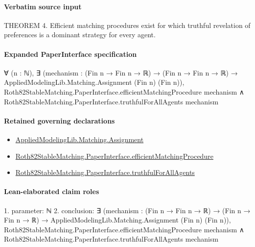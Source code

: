 \documentclass[10pt]{article}
\begin{document}
\paragraph{Verbatim source input}
\begin{ReviewVerbatim}
THEOREM 4. Efficient matching procedures exist for which truthful revelation of
preferences is a dominant strategy for every agent.
\end{ReviewVerbatim}



\paragraph{Expanded PaperInterface specification}
\begin{ReviewVerbatim}
∀ (n : ℕ),
  ∃ (mechanism : (Fin n → Fin n → ℝ) → (Fin n → Fin n → ℝ) → AppliedModelingLib.Matching.Assignment (Fin n) (Fin n)),
    Roth82StableMatching.PaperInterface.efficientMatchingProcedure mechanism ∧
      Roth82StableMatching.PaperInterface.truthfulForAllAgents mechanism
\end{ReviewVerbatim}

\paragraph{Retained governing declarations}
\begin{itemize}\raggedright
\item \hyperlink{governing-declaration-508c084086b006b8}{Applied\allowbreak{}Modeling\allowbreak{}Lib.\allowbreak{}Matching.\allowbreak{}Assignment}
\item \hyperlink{paper-prerequisite-959836477d3894e7}{Roth82\allowbreak{}Stable\allowbreak{}Matching.\allowbreak{}Paper\allowbreak{}Interface.\allowbreak{}efficient\allowbreak{}Matching\allowbreak{}Procedure}
\item \hyperlink{paper-prerequisite-a52c1e717dd94cee}{Roth82\allowbreak{}Stable\allowbreak{}Matching.\allowbreak{}Paper\allowbreak{}Interface.\allowbreak{}truthful\allowbreak{}For\allowbreak{}All\allowbreak{}Agents}
\end{itemize}
\paragraph{Lean-elaborated claim roles}\begin{ReviewVerbatim}
1. parameter: ℕ
2. conclusion: ∃ (mechanism : (Fin n → Fin n → ℝ) → (Fin n → Fin n → ℝ) → AppliedModelingLib.Matching.Assignment (Fin n) (Fin n)),
  Roth82StableMatching.PaperInterface.efficientMatchingProcedure mechanism ∧
    Roth82StableMatching.PaperInterface.truthfulForAllAgents mechanism
\end{ReviewVerbatim}
\end{document}
